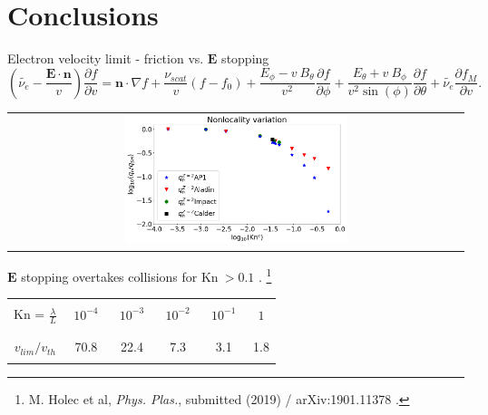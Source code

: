 \documentclass[8pt, compress]{beamer}
\newcommand{\pdv}[2]{\frac{\partial{#1}}{\partial{#2}}}
\newcommand{\vect}[1]{\boldsymbol{#1}}
\newcommand{\nue}{\nu_{e}}
\newcommand{\nuscat}{\nu_{scat}}
\newcommand{\vmag}{v}
\newcommand{\vn}{\vect{n}}
\newcommand{\E}{\vect{E}}
\newcommand{\fM}{f_M}
\newcommand{\fzero}{f_0}
\begin{document}
\section{Conclusions}

\begin{frame}
\begin{center}
{\Large Electron velocity limit - friction vs. $\vect{E}$ stopping}
\begin{equation}
  \left( \tilde{\nue} - \frac{\E\cdot\vn}{\vmag} \right) 
  \frac{\partial f}{\partial \vmag}
  =
  \vn\cdot\nabla f 
  + \frac{\nuscat}{\vmag} \left(f - \fzero\right)
  + \frac{E_\phi 
  - \vmag~B_\theta}{\vmag^2}\pdv{f}{\phi}
  + \frac{E_\theta + \vmag~B_\phi}{\vmag^2\sin(\phi)}\pdv{f}{\theta}
  + \tilde{\nue} \frac{\partial \fM}{\partial v} .
  \nonumber
\end{equation}

\begin{tabular}{c}
\includegraphics[width=0.5\textwidth]{../figures/Kn_results.png}
\end{tabular}

$\vect{E}$ stopping overtakes collisions for Kn$~>0.1$ .
\let\thefootnote\relax\footnote{M. Holec et al, \textit{Phys. Plas.}, submitted (2019) / arXiv:1901.11378 .}

\begin{tabular}{c|ccccc}
    \hline\hline\\
    Kn = $\frac{\lambda}{L}$ & $\,\,10^{-4}\,\,$ & $\,\,10^{-3}\,\,$ & $\,\,10^{-2}\,\,$ & $\,\,10^{-1}\,\,$ & $\,\,1\,\,$ \\\\
    \hline\\
    $v_{lim} / v_{th}$ & 70.8 & 22.4 & 7.3 & 3.1 & 1.8\\\\
    \hline\hline
\end{tabular} 
\end{center}
\end{frame}
\end{document}
